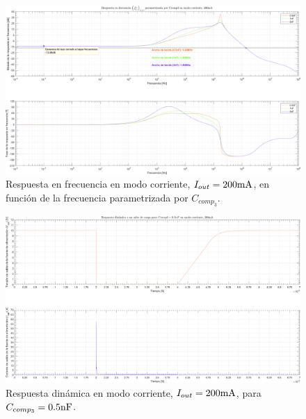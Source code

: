 \clearpage

\begin{figure}[H] %
\begin{center}
\includegraphics[width=1.1 \textwidth, angle=90]{./img/plots/rf/power_supply_CCOMP3_RF_Modo4.png}
\caption{\label{fig:fig_power_supply_CCOMP3_RF_Modo4}\footnotesize{Respuesta en frecuencia en modo corriente, $I_{out} = 200 \si[per-mode=symbol]{\milli\ampere}$, en función de la frecuencia parametrizada por $C_{comp_{3}}$.}}
\end{center}
\end{figure}

\clearpage

\begin{figure}[H] %
\begin{center}
\includegraphics[width=1.1 \textwidth, angle=90]{./img/plots/dynamic/power_supply_CCOMP3_0_5n_STEP_Modo4.png}
\caption{\label{fig:fig_power_supply_CCOMP3_STEP_0_5n_Modo4}\footnotesize{Respuesta dinámica en modo corriente, $I_{out} = 200 \si[per-mode=symbol]{\milli\ampere}$, para $C_{comp_{3}} = 0.5 \si[per-mode=symbol]{\nano\farad} $.}}
\end{center}
\end{figure}

